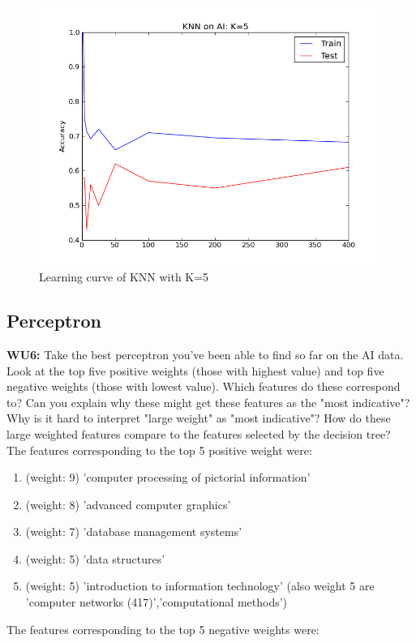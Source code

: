 \documentclass[a4paper,11pt]{article}
\begin{document}
\begin{figure}[h!]
  \caption{Learning curve of KNN with K=5}
\includegraphics[scale=0.5]{knnOnAI.png} 
\end{figure}


\pagebreak
\pagebreak
\subsection{Perceptron}
\textbf{WU6:} \textsf{Take the best perceptron you've been able to find
  so far on the AI data.  Look at the top five positive weights (those
  with highest value) and top five negative weights (those with lowest
  value).  Which features do these correspond to?  Can you explain why
  these might get these features as the "most indicative"?  Why is it
  hard to interpret "large weight" as "most indicative"?  How do these
  large weighted features compare to the features selected by the
  decision tree?}\\


The features corresponding to the top 5 positive weight were:

\begin{enumerate}
\item (weight: 9) 'computer processing of pictorial information' 
\item (weight: 8) 'advanced computer graphics'
\item (weight: 7) 'database management systems'
\item (weight: 5) 'data structures'
\item (weight: 5) 'introduction to information technology' (also
  weight 5 are 'computer networks (417)','computational methods')

\end{enumerate}
The features corresponding to the top 5 negative weights were:
\end{document}
